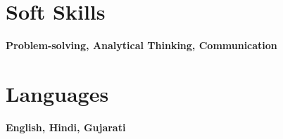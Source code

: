 \documentclass[A4,11pt]{article}
\begin{document}
\vspace{-0.4cm}
\section{Soft Skills}
\hspace{0.4cm}
\textbf{Problem-solving, Analytical Thinking, Communication}

\section{Languages}
\hspace{0.4cm}
  \textbf{English, Hindi, Gujarati}
\end{document}
